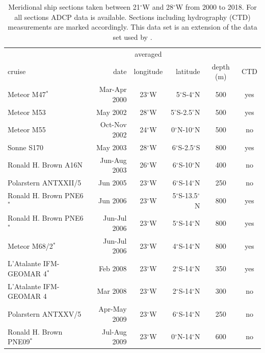 \documentclass[os, manuscript]{copernicus}
\begin{document}
	
	\appendix
	\section{}    %
	\begin{table}[t]
		\caption{Meridional ship sections taken between 21$^{\circ}$W and 28$^{\circ}$W from 2000 to 2018. For all sections ADCP data is available. Sections including hydrography (CTD) measurements are marked accordingly. This data set is an extension of the data set used by \cite{Burmeister2020}.}
		\centering
		\begin{tabular}{lrcrcc}
			\tophline
			& &averaged & & &\\
			cruise & date & longitude&latitude & depth (m) & CTD\\
			\middlehline
			Meteor M47$ ^{*} $ & Mar-Apr 2000 & 23$^{\circ}$W & 5$^{\circ}$S-4$^{\circ}$N & 500 & yes \\
			Meteor M53 & May 2002 & 28$^{\circ}$W & 5$^{\circ}$S-2.5$^{\circ}$N & 500 & yes \\
			Meteor M55 & Oct-Nov 2002 & 24$^{\circ}$W & 0$^{\circ}$N-10$^{\circ}$N & 500 & no \\
			Sonne S170 & May 2003 & 28$^{\circ}$W & 6$^{\circ}$S-2.5$^{\circ}$S & 800 & yes \\
			Ronald H. Brown A16N & Jun-Aug 2003 & 26$^{\circ}$W & 6$^{\circ}$S-10$^{\circ}$N & 400 & no \\
			Polarstern ANTXXII/5 & Jun 2005 & 23$^{\circ}$W & 6$^{\circ}$S-14$^{\circ}$N & 250 & no \\
			Ronald H. Brown PNE6$ ^{*} $ & Jun 2006 & 23$^{\circ}$W & 5$^{\circ}$S-13.5$^{\circ}$N & 800 & yes  \\
			Ronald H. Brown PNE6$ ^{*} $ & Jun-Jul 2006 & 23$^{\circ}$W & 5$^{\circ}$S-14$^{\circ}$N & 800 & yes  \\
			Meteor M68/2$ ^{*} $ & Jun-Jul 2006 & 23$^{\circ}$W & 4$^{\circ}$S-14$^{\circ}$N & 800 & yes  \\
			L'Atalante IFM-GEOMAR 4$ ^{*} $ & Feb 2008 &  23$^{\circ}$W & 2$^{\circ}$S-14$^{\circ}$N & 350 & yes \\
			L'Atalante IFM-GEOMAR 4 & Mar 2008 &  23$^{\circ}$W & 2$^{\circ}$S-14$^{\circ}$N & 300 & no  \\
			Polarstern ANTXXV/5 & Apr-May 2009 & 23$^{\circ}$W & 6$^{\circ}$S-14$^{\circ}$N & 250  & no \\
			Ronald H. Brown PNE09$ ^{*} $ & Jul-Aug 2009 & 23$^{\circ}$W & 0$^{\circ}$N-14$^{\circ}$N & 600 & no \\

\end{tabular}
\end{table}
\end{document}
